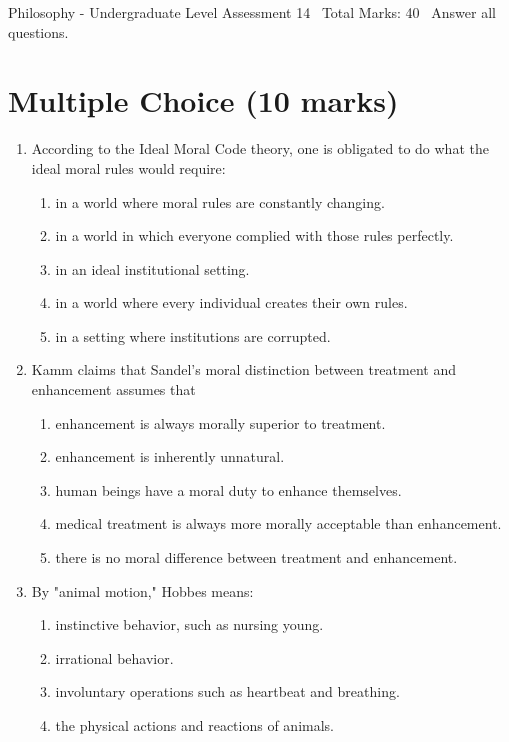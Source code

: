 \documentclass[12pt]{article}
\begin{document}
\begin{center}
Philosophy - Undergraduate Level Assessment 14 \
Total Marks: 40 \
Answer all questions.
\end{center}

\section*{Multiple Choice (10 marks)}
\begin{enumerate}[label=\arabic*.]
\item According to the Ideal Moral Code theory, one is obligated to do what the ideal moral rules would require:
\begin{enumerate}[label=(\alph*)]
    \item in a world where moral rules are constantly changing.
    \item in a world in which everyone complied with those rules perfectly.
    \item in an ideal institutional setting.
    \item in a world where every individual creates their own rules.
    \item in a setting where institutions are corrupted.
\end{enumerate}
\item Kamm claims that Sandel's moral distinction between treatment and enhancement assumes that
\begin{enumerate}[label=(\alph*)]
    \item enhancement is always morally superior to treatment.
    \item enhancement is inherently unnatural.
    \item human beings have a moral duty to enhance themselves.
    \item medical treatment is always more morally acceptable than enhancement.
    \item there is no moral difference between treatment and enhancement.
\end{enumerate}
\item By "animal motion," Hobbes means:
\begin{enumerate}[label=(\alph*)]
    \item instinctive behavior, such as nursing young.
    \item irrational behavior.
    \item involuntary operations such as heartbeat and breathing.
    \item the physical actions and reactions of animals.

\end{enumerate}
\end{enumerate}
\end{document}
